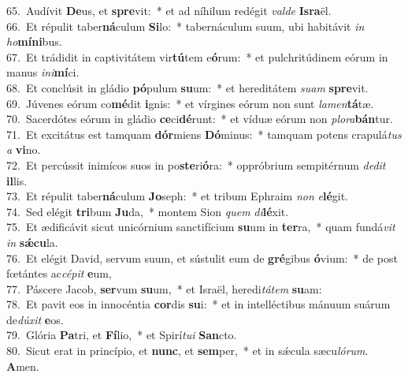 {65.~}Audívit \textbf{De}us, et \textbf{spre}vit:~* et ad níhilum redégit \textit{val}\textit{de} \textbf{Is}\textbf{ra}ël.\\
{66.~}Et répulit taber\textbf{ná}culum \textbf{Si}lo:~* tabernáculum suum, ubi habitávit \textit{in} \textit{ho}\textbf{mí}\textbf{ni}bus.\\
{67.~}Et trádidit in captivitátem vir\textbf{tú}tem e\textbf{ó}rum:~* et pulchritúdinem eórum in manus \textit{i}\textit{ni}\textbf{mí}ci.\\
{68.~}Et conclúsit in gládio \textbf{pó}pulum \textbf{su}um:~* et hereditátem \textit{su}\textit{am} \textbf{spre}vit.\\
{69.~}Júvenes eórum co\textbf{mé}dit \textbf{i}gnis:~* et vírgines eórum non sunt \textit{la}\textit{men}\textbf{tá}tæ.\\
{70.~}Sacerdótes eórum in gládio \textbf{ce}ci\textbf{dé}runt:~* et víduæ eórum non \textit{plo}\textit{ra}\textbf{bán}tur.\\
{71.~}Et excitátus est tamquam \textbf{dór}miens \textbf{Dó}minus:~* tamquam potens crapulá\textit{tus} \textit{a} \textbf{vi}no.\\
{72.~}Et percússit inimícos suos in po\textbf{ste}ri\textbf{ó}ra:~* oppróbrium sempitérnum \textit{de}\textit{dit} \textbf{il}lis.\\
{73.~}Et répulit taber\textbf{ná}culum \textbf{Jo}seph:~* et tribum Ephraim \textit{non} \textit{e}\textbf{lé}git.\\
{74.~}Sed elégit \textbf{tri}bum \textbf{Ju}da,~* montem Sion \textit{quem} \textit{di}\textbf{lé}xit.\\
{75.~}Et ædificávit sicut unicórnium sanctifícium \textbf{su}um in \textbf{ter}ra,~* quam fundá\textit{vit} \textit{in} \textbf{sǽ}\textbf{cu}la.\\
{76.~}Et elégit David, servum suum, et sústulit eum de \textbf{gré}gibus \textbf{ó}vium:~* de post fœtántes ac\textit{cé}\textit{pit} \textbf{e}um,\\
{77.~}Páscere Jacob, \textbf{ser}vum \textbf{su}um,~* et Israël, heredi\textit{tá}\textit{tem} \textbf{su}am:\\
{78.~}Et pavit eos in innocéntia \textbf{cor}dis \textbf{su}i:~* et in intelléctibus mánuum suárum de\textit{dú}\textit{xit} \textbf{e}os.\\
{79.~}Glória \textbf{Pa}tri, et \textbf{Fí}lio,~* et Spirí\textit{tu}\textit{i} \textbf{San}cto.\\
{80.~}Sicut erat in princípio, et \textbf{nunc}, et \textbf{sem}per,~* et in sǽcula sæcu\textit{ló}\textit{rum}. \textbf{A}men.\\
